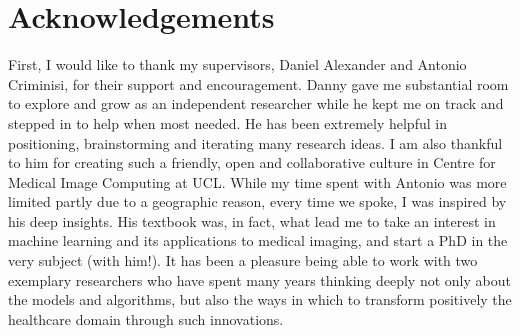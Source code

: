 \documentclass[12pt,a4paper,twoside]{book}
\begin{document}

%



\chapter*{Acknowledgements}
First, I would like to thank my supervisors, Daniel Alexander and Antonio Criminisi, for their support and encouragement. Danny gave me substantial room to explore and grow as an independent researcher while he kept me on track and stepped in to help when most needed. He has been extremely helpful in positioning, brainstorming and iterating many research ideas. I am also thankful to him for creating such a friendly, open and collaborative culture in Centre for Medical Image Computing at UCL. While my time spent with Antonio was more limited partly due to a geographic reason, every time we spoke, I was inspired by his deep insights. His textbook was, in fact, what lead me to take an interest in machine learning and its applications to medical imaging, and start a PhD in the very subject (with him!). It has been a pleasure being able to work with two exemplary researchers who have spent many years thinking deeply not only about the models and algorithms, but also the ways in which to transform positively the healthcare domain through such innovations. 
\end{document}
